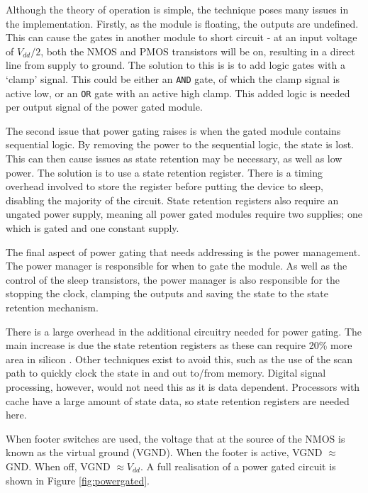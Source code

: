 Although the theory of operation is simple, the technique poses many issues in the implementation.
Firstly, as the module is floating, the outputs are undefined.
This can cause the gates in another module to short circuit - at an input voltage of $ V_{dd} / 2 $, both the NMOS and PMOS transistors will be on, resulting in a direct line from supply to ground. 
The solution to this is is to add logic gates with a `clamp' signal. 
This could be either an \texttt{AND} gate, of which the clamp signal is active low, or an \texttt{OR} gate with an active high clamp. 
This added logic is needed per output signal of the power gated module.

The second issue that power gating raises is when the gated module contains sequential logic. 
By removing the power to the sequential logic, the state is lost. 
This can then cause issues as state retention may be necessary, as well as low power.
The solution is to use a state retention register. 
There is a timing overhead involved to store the register before putting the device to sleep, disabling the majority of the circuit. 
State retention registers also require an ungated power supply, meaning all power gated modules require two supplies; one which is gated and one constant supply.

The final aspect of power gating that needs addressing is the power management.
The power manager is responsible for when to gate the module. %
As well as the control of the sleep transistors, the power manager is also responsible for the stopping the clock, clamping the outputs and saving the state to the state retention mechanism.

There is a large overhead in the additional circuitry needed for power gating. 
The main increase is due the state retention registers as these can require 20\% more area in silicon \cite{stateretarea}. 
Other techniques exist to avoid this, such as the use of the scan path to quickly clock the state in and out to/from memory.
Digital signal processing, however, would not need this as it is data dependent. 
Processors with cache have a large amount of state data, so state retention registers are needed here.

When footer switches are used, the voltage that at the source of the NMOS is known as the virtual ground (VGND). When the footer is active, VGND $\approx$ GND. When off, VGND $\approx V_{dd}$.
A full realisation of a power gated circuit is shown in Figure \ref{fig:powergated}. 


